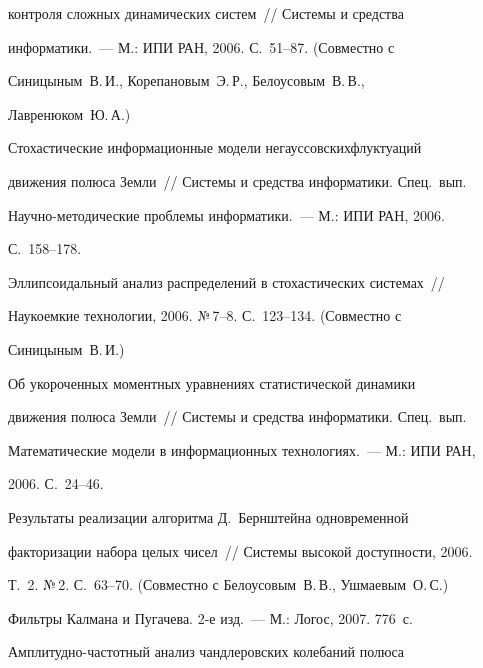 контроля сложных динамических систем~// Системы и средства


информатики.~--- М.: ИПИ РАН, 2006. С.~51--87. (Совместно с


Синицыным~В.\,И., Корепановым~Э.\,Р., Белоусовым~В.\,В.,


Лавренюком~Ю.\,А.)





 Стохастические информационные модели негауссовских\linebreak флуктуаций


движения полюса Земли~// Системы и средства информатики. Спец.\ вып.\


Научно-методические проблемы информатики.~--- М.: ИПИ РАН, 2006.


С.~158--178.





 Эллипсоидальный анализ распределений в стохастических системах~//


Наукоемкие технологии, 2006. №\,7--8. С.~123--134. (Совместно с


Синицыным~В.\,И.)





 Об укороченных моментных уравнениях статистической динамики


движения полюса Земли~// Системы и средства информатики. Спец.\ вып.\


Математические модели в информационных технологиях.~--- М.: ИПИ РАН,


2006. С.~24--46.





 Результаты реализации алгоритма Д.~Бернштейна одновременной


факторизации набора целых чисел~// Системы высокой доступности, 2006.


Т.~2. №\,2. С.~63--70. (Совместно с Бе\-ло\-усо\-вым~В.\,В., Ушмаевым~О.\,С.)










 Фильтры Калмана и Пугачева. 2-е изд.~--- М.: Логос, 2007. 776~с.





 Амплитудно-частотный анализ чандлеровских колебаний полюса


